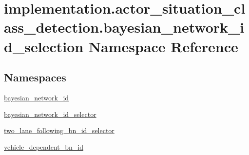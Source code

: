 \hypertarget{namespaceimplementation_1_1actor__situation__class__detection_1_1bayesian__network__id__selection}{}\section{implementation.\+actor\+\_\+situation\+\_\+class\+\_\+detection.\+bayesian\+\_\+network\+\_\+id\+\_\+selection Namespace Reference}
\label{namespaceimplementation_1_1actor__situation__class__detection_1_1bayesian__network__id__selection}
\subsection*{Namespaces}
\begin{DoxyCompactItemize}
\item 
 \hyperlink{namespaceimplementation_1_1actor__situation__class__detection_1_1bayesian__network__id__selection_1_1bayesian__network__id}{bayesian\+\_\+network\+\_\+id}
\item 
 \hyperlink{namespaceimplementation_1_1actor__situation__class__detection_1_1bayesian__network__id__selectiof39fea08d6bf5e12f9f85b2871294e54}{bayesian\+\_\+network\+\_\+id\+\_\+selector}
\item 
 \hyperlink{namespaceimplementation_1_1actor__situation__class__detection_1_1bayesian__network__id__selectio32bdc68987338a8f52088e6b77ed8f46}{two\+\_\+lane\+\_\+following\+\_\+bn\+\_\+id\+\_\+selector}
\item 
 \hyperlink{namespaceimplementation_1_1actor__situation__class__detection_1_1bayesian__network__id__selection_1_1vehicle__dependent__bn__id}{vehicle\+\_\+dependent\+\_\+bn\+\_\+id}
\end{DoxyCompactItemize}
